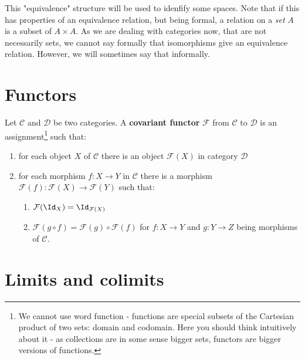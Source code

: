 This "equivalence" structure will be used to idenfify some spaces. Note that if this has properties of an equivalence relation, but being formal, a relation on a \emph{set} $A$ is a subset of $A\times A$. As we are dealing with categories now, that are not necessarily sets, we cannot say formally that isomorphisms give an equivalence relation. However, we will sometimes say that informally.


\section{Functors}
\begin{definition}
    Let $\mathcal C$ and $\mathcal D$ be two categories. A \textbf{covariant functor} $\mathcal F$ from $\mathcal C$ to $\mathcal D$ is an assignment\footnote{We cannot use word function - functions are special subsets of the Cartesian product of two sets: domain and codomain. Here you should think intuitively about it - as collections are in some sense bigger sets, functors are bigger versions of functions.} such that:
    \begin{enumerate}
      \item for each object $X$ of $\mathcal C$ there is an object $\mathcal F(X)$ in category $\mathcal D$
      \item for each morphism $f: X\to Y$ in $\mathcal C$ there is a morphism $\mathcal F(f):\mathcal F(X)\to \mathcal F(Y)$ such that:
        \begin{enumerate}
          \item $\mathcal F(\Id_X)=\Id_{\mathcal F(X)}$
          \item $\mathcal F(g\circ f) = \mathcal F(g)\circ \mathcal F(f)$ for $f:X\to Y$ and $g:Y\to Z$ being morphisms of $\mathcal C$.
        \end{enumerate}
    \end{enumerate}
\end{definition}


\section{Limits and colimits}
